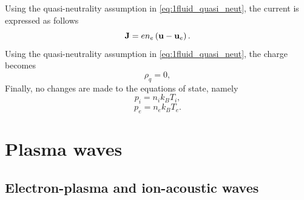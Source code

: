 \documentclass[a4paper,11pt]{report}
\begin{document}
Using the quasi-neutrality assumption in \cref{eq:1fluid_quasi_neut}, the current is expressed as follows
\begin{equation}
    \label{eq:sf_1ion_curr_density}
    \mathbf{J} = e n_e \left( \mathbf{u} - \mathbf{u}_e \right).
\end{equation}
Using the quasi-neutrality assumption in \cref{eq:1fluid_quasi_neut}, the charge becomes
\begin{equation}
    \label{eq:sf_1ion_mass_density}
    \rho_q = 0,
\end{equation}
Finally, no changes are made to the equations of state, namely
\begin{equation}
    \label{eq:sf_1ion_eos_ion}
    p_i = n_i k_B T_i,
\end{equation}
\begin{equation}
    \label{eq:sf_1ion_eos_elec}
    p_e = n_e k_B T_e.
\end{equation}

\chapter{Plasma waves}

\section{Electron-plasma and ion-acoustic waves}

\end{document}
